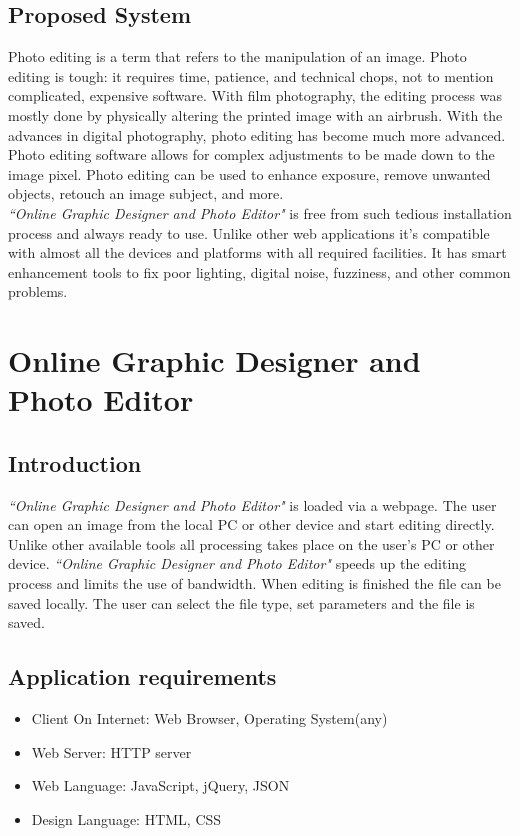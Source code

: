 \documentclass[12pt,a4 paper]{report}
\begin{document}
\section{Proposed System}
Photo editing is a term that refers to the manipulation of an image. Photo editing is tough: it requires time, patience, and technical chops, not to mention complicated, expensive software. With film photography, the editing process was mostly done by physically altering the printed image with an airbrush. With the advances in digital photography, photo editing has become much more advanced. Photo editing software allows for complex adjustments to be made down to the image pixel. Photo editing can be used to enhance exposure, remove unwanted objects, retouch an image subject, and more. \\

\textit{``Online Graphic Designer and Photo Editor"} is free from such tedious installation process and always ready to use. Unlike other web applications it's compatible with almost all the devices and platforms with all required facilities. It has smart enhancement tools to fix poor lighting, digital noise, fuzziness, and other common problems. \\

\chapter{Online Graphic Designer and Photo Editor}

\section{Introduction}
\textit{``Online Graphic Designer and Photo Editor"} is loaded via a webpage. The user can open an image from the local PC or other device and start editing directly. Unlike other available tools all processing takes place on the user's PC or other device. \textit{``Online Graphic Designer and Photo Editor"} speeds up the editing process and limits the use of bandwidth. When editing is finished the file can be saved locally. The user can select the file type, set parameters and the file is saved. \\

\section{Application requirements}

\begin{itemize}
\item Client On Internet: Web Browser, Operating System(any) 
\item Web Server: HTTP server 
\item Web Language: JavaScript, jQuery, JSON 
\item Design Language: HTML, CSS
\end{itemize}
\end{document}
